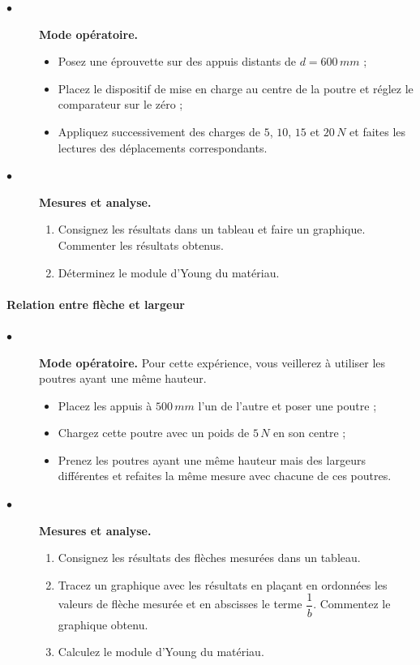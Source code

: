 \documentclass[lecture.tex]{subfiles}
\begin{document}
\begin{description}
  \item[$\bullet$] \textbf{Mode opératoire.}
\begin{itemize}[label =  , font =\tiny]
\item Posez une éprouvette sur des appuis distants de $d=600\, mm$ ;
\item Placez le dispositif de mise en charge au centre de la poutre et réglez le comparateur sur le zéro ;
\item Appliquez successivement des charges de $5$, $10$, $15$ et $20\, N$ et faites les lectures des déplacements correspondants.
\end{itemize}

\item[$\bullet$] \textbf{Mesures et analyse.}
\begin{enumerate}[resume]
\item Consignez les résultats dans un tableau et faire un graphique. Commenter les résultats obtenus.
\item Déterminez le module d'Young du matériau.
\end{enumerate}

\end{description}

\paragraph*{Relation entre flèche et largeur}

\begin{description}

\item[$\bullet$] \textbf{Mode opératoire.} Pour cette expérience, vous veillerez à utiliser les poutres ayant une même hauteur.
\begin{itemize}[label =  , font =\tiny]
\item Placez les appuis à $500\, mm$ l'un de l'autre et poser une poutre ;
\item Chargez cette poutre avec un poids de $5\, N$ en son centre ;
\item Prenez les poutres ayant une même hauteur mais des largeurs différentes et refaites la même mesure avec chacune de ces poutres.
\end{itemize}

\item[$\bullet$] \textbf{Mesures et analyse.}
\begin{enumerate}[resume]
\item Consignez les résultats des flèches mesurées dans un tableau.
\item Tracez un graphique avec les résultats en plaçant en ordonnées les valeurs de flèche mesurée et en abscisses le terme $\dfrac{1}{b}$.  Commentez le graphique obtenu.
\item Calculez le module d'Young du matériau.
\end{enumerate}

\end{description}
\end{document}
